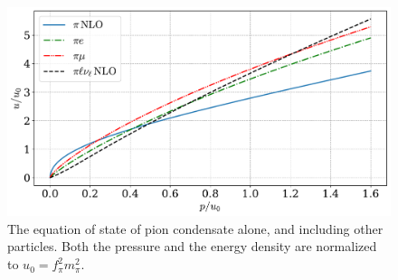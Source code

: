 \begin{figure}[!htb]
    \centering
    \includegraphics[width=.82\textwidth]{../scripts/figurer/pion_star/pion_all_eos.pdf}
    \caption{
        The equation of state of pion condensate alone, and including other particles.
        Both the pressure and the energy density are normalized to $u_0 = f_\pi^2 m_\pi^2$.
    }
    \label{fig: all eos}
\end{figure}


